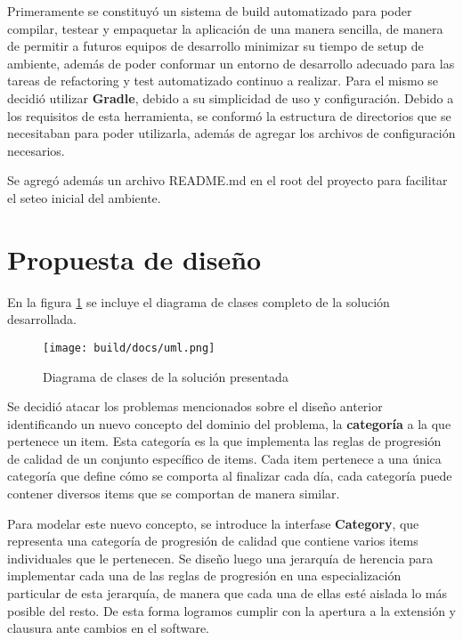 \documentclass[a4paper,11pt]{article}
\begin{document}
Primeramente se constituyó un sistema de build automatizado para poder
compilar, testear y empaquetar la aplicación de una manera sencilla, de manera
de permitir a futuros equipos de desarrollo minimizar su tiempo de setup de
ambiente, además de poder conformar un entorno de desarrollo adecuado para las
tareas de refactoring y test automatizado continuo a realizar. Para el mismo se
decidió utilizar \textbf{Gradle}, debido a su simplicidad de uso y configuración.
Debido a los requisitos de esta herramienta, se conformó la estructura de
directorios que se necesitaban para poder utilizarla, además de agregar los
archivos de configuración necesarios.

Se agregó además un archivo README.md en el root del proyecto para facilitar el
seteo inicial del ambiente.

\section{Propuesta de diseño}

En la figura \ref{fig:clases} se incluye el diagrama de clases completo de la
solución desarrollada.

\begin{figure}[h!t]
  \centering
  \texttt{[image: build/docs/uml.png]}
  \caption{Diagrama de clases de la solución presentada} \label{fig:clases}
\end{figure}

\FloatBarrier

Se decidió atacar los problemas mencionados sobre el diseño anterior
identificando un nuevo concepto del dominio del problema, la \textbf{categoría}
a la que pertenece un item. Esta categoría es la que implementa las reglas de
progresión de calidad de un conjunto específico de items. Cada item pertenece a
una única categoría que define cómo se comporta al finalizar cada día, cada
categoría puede contener diversos items que se comportan de manera similar.

Para modelar este nuevo concepto, se introduce la interfase \textbf{Category},
que representa una categoría de progresión de calidad que contiene varios items
individuales que le pertenecen. Se diseño luego una jerarquía de herencia para
implementar cada una de las reglas de progresión en una especialización
particular de esta jerarquía, de manera que cada una de ellas esté aislada lo
más posible del resto. De esta forma logramos cumplir con la apertura a la
extensión y clausura ante cambios en el software.
\end{document}

